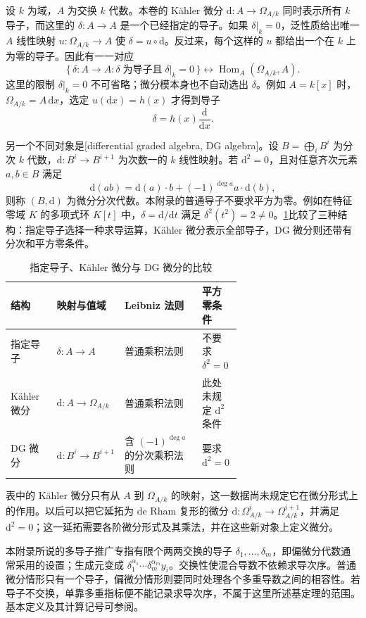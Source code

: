 设 \(k\) 为域，\(A\) 为交换 \(k\) 代数。本卷的 Kähler 微分 \(\mathrm{d}:A\to\Omega_{A/k}\) 同时表示所有 \(k\) 导子，而这里的 \(\delta:A\to A\) 是一个已经指定的导子。如果 \(\delta|_k=0\)，泛性质给出唯一 \(A\) 线性映射 \(u:\Omega_{A/k}\to A\) 使 \(\delta=u\circ \mathrm{d}\)。反过来，每个这样的 \(u\) 都给出一个在 \(k\) 上为零的导子。因此有一一对应
\[
	\{\,\delta:A\to A:\delta\;\text{为导子且}\;\delta|_k=0\,\} \longleftrightarrow\operatorname{Hom}_A(\Omega_{A/k},A).
\]
这里的限制 \(\delta|_k=0\) 不可省略；微分模本身也不自动选出 \(\delta\)。例如 \(A=k[x]\) 时，\(\Omega_{A/k}=A\,\mathrm{d}x\)，选定 \(u(\mathrm{d}x)=h(x)\) 才得到导子
\[
	\delta=h(x)\frac{\mathrm{d}}{\mathrm{d}x}.
\]

另一个不同对象是[differential graded algebra, DG algebra]。设 \(B=\bigoplus_iB^i\) 为分次 \(k\) 代数，\(\mathrm{d}:B^i\to B^{i+1}\) 为次数一的 \(k\) 线性映射。若 \(\mathrm{d}^2=0\)，且对任意齐次元素 \(a,b\in B\) 满足
\[
	\mathrm{d}(ab)=\mathrm{d}(a)\cdot b+(-1)^{\deg a}a\cdot\mathrm{d}(b),
\]
则称 \((B,\mathrm{d})\) 为微分分次代数。本附录的普通导子不要求平方为零。例如在特征零域 \(K\) 的多项式环 \(K[t]\) 中，\(\delta=\mathrm{d}/\mathrm{d}t\) 满足 \(\delta^2(t^2)=2\ne0\)。\cref{b3:tab:E-three-differentials}比较了三种结构：指定导子选择一种求导运算，Kähler 微分表示全部导子，DG 微分则还带有分次和平方零条件。

\begin{table}[htbp]
	\centering
	\caption{指定导子、Kähler 微分与 DG 微分的比较}
	\label{b3:tab:E-three-differentials}
	\begin{tabularx}{\linewidth}{@{}>{\raggedright\arraybackslash}p{0.20\linewidth}>{\raggedright\arraybackslash}p{0.28\linewidth}>{\raggedright\arraybackslash}X>{\raggedright\arraybackslash}p{0.17\linewidth}@{}}
		\toprule
		结构 & 映射与值域 & Leibniz 法则 & 平方零条件 \\
		\midrule
		指定导子 & \(\delta:A\to A\) & 普通乘积法则 & 不要求 \(\delta^2=0\) \\
		Kähler 微分 & \(\mathrm{d}:A\to\Omega_{A/k}\) & 普通乘积法则 & 此处未规定 \(\mathrm{d}^2\) 条件 \\
		DG 微分 & \(\mathrm{d}:B^i\to B^{i+1}\) & 含 \((-1)^{\deg a}\) 的分次乘积法则 & 要求 \(\mathrm{d}^2=0\) \\
		\bottomrule
	\end{tabularx}
\end{table}

表中的 Kähler 微分只有从 \(A\) 到 \(\Omega_{A/k}\) 的映射，这一数据尚未规定它在微分形式上的作用。以后可以把它延拓为 de Rham 复形的微分 \(\mathrm{d}:\Omega^i_{A/k}\to\Omega^{i+1}_{A/k}\)，并满足 \(\mathrm{d}^2=0\)；这一延拓需要各阶微分形式及其乘法，并在这些新对象上定义微分。

\ProseParagraphBreak
本附录所说的多导子推广专指有限个两两交换的导子 \(\delta_1,\ldots,\delta_m\)，即偏微分代数通常采用的设置；生成元变成 \(\delta_1^{\alpha_1}\cdots\delta_m^{\alpha_m}y_i\)。交换性使混合导数不依赖求导次序。普通微分情形只有一个导子，偏微分情形则要同时处理各个多重导数之间的相容性。若导子不交换，单靠多重指标便不能记录求导次序，不属于这里所述基定理的范围。基本定义及其计算记号可参阅\cite[Section 3]{BoulierLazardOllivierPetitot2009DifferentialIdeals}。
